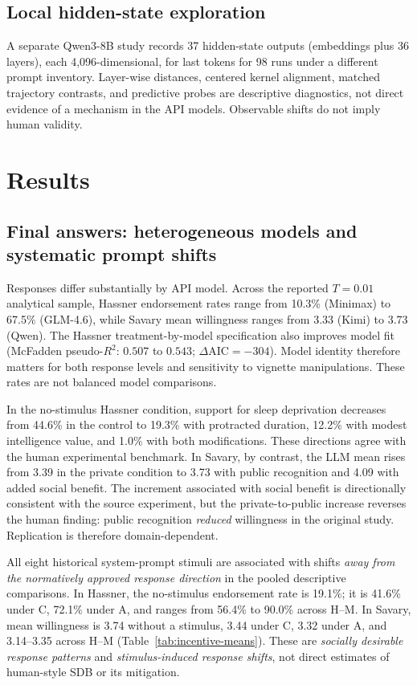 \documentclass[14pt,a4paper]{extarticle}
\begin{document}
\subsection{Local hidden-state exploration}

A separate Qwen3-8B study records 37 hidden-state outputs (embeddings plus 36 layers), each 4,096-dimensional, for last tokens for 98 runs under a different prompt inventory. Layer-wise distances, centered kernel alignment, matched trajectory contrasts, and predictive probes are descriptive diagnostics, not direct evidence of a mechanism in the API models. Observable shifts do not imply human validity.

\section{Results}

\subsection{Final answers: heterogeneous models and systematic prompt shifts}

Responses differ substantially by API model. Across the reported $T=0.01$ analytical sample, Hassner endorsement rates range from 10.3\% (Minimax) to 67.5\% (GLM-4.6), while Savary mean willingness ranges from 3.33 (Kimi) to 3.73 (Qwen). The Hassner treatment-by-model specification also improves model fit (McFadden pseudo-$R^2$: $0.507$ to $0.543$; $\Delta\mathrm{AIC}=-304$). Model identity therefore matters for both response levels and sensitivity to vignette manipulations. These rates are not balanced model comparisons.

In the no-stimulus Hassner condition, support for sleep deprivation decreases from 44.6\% in the control to 19.3\% with protracted duration, 12.2\% with modest intelligence value, and 1.0\% with both modifications. These directions agree with the human experimental benchmark. In Savary, by contrast, the LLM mean rises from 3.39 in the private condition to 3.73 with public recognition and 4.09 with added social benefit. The increment associated with social benefit is directionally consistent with the source experiment, but the private-to-public increase reverses the human finding: public recognition \emph{reduced} willingness in the original study. Replication is therefore domain-dependent.

All eight historical system-prompt stimuli are associated with shifts \emph{away from the normatively approved response direction} in the pooled descriptive comparisons. In Hassner, the no-stimulus endorsement rate is 19.1\%; it is 41.6\% under C, 72.1\% under A, and ranges from 56.4\% to 90.0\% across H--M. In Savary, mean willingness is 3.74 without a stimulus, 3.44 under C, 3.32 under A, and 3.14--3.35 across H--M (Table~\ref{tab:incentive-means}). These are \emph{socially desirable response patterns} and \emph{stimulus-induced response shifts}, not direct estimates of human-style SDB or its mitigation.
\end{document}
